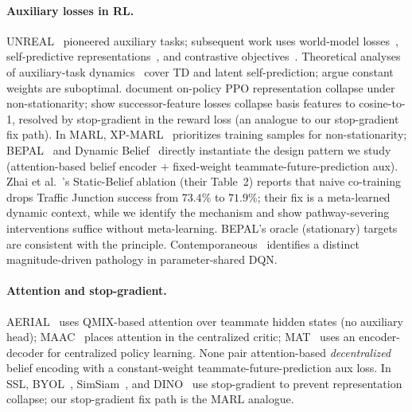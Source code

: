 \documentclass{article}
\theoremstyle{plain}
\theoremstyle{definition}
\theoremstyle{remark}
\begin{document}
\paragraph{Auxiliary losses in RL.}
UNREAL~\cite{jaderberg2016reinforcement} pioneered auxiliary tasks;
subsequent work uses world-model
losses~\cite{hafner2023mastering}, self-predictive
representations~\cite{schwarzer2021dataefficient,fang2024predictive},
and contrastive objectives~\cite{laskin2020curl}. Theoretical analyses
of auxiliary-task
dynamics~\cite{lyle2021effect,voelcker2024selfprediction} cover TD and
latent self-prediction; \cite{du2018adapting,lin2019adaptive} argue
constant weights are suboptimal.
\cite{moalla2024norepnotrust} document on-policy PPO representation
collapse under non-stationarity; \cite{chua2024successor} show
successor-feature losses collapse basis features to cosine-to-1,
resolved by stop-gradient in the reward loss (an analogue to our
stop-gradient fix path). In MARL,
XP-MARL~\cite{xu2024xpmarl} prioritizes training samples for
non-stationarity; BEPAL~\cite{huang2025bepal} and Dynamic
Belief~\cite{zhai2023dynamic} directly instantiate the design pattern
we study (attention-based belief encoder $+$ fixed-weight
teammate-future-prediction aux). Zhai et al.~\cite{zhai2023dynamic}'s
Static-Belief ablation (their Table~2) reports that naive co-training
drops Traffic Junction success from $73.4\%$ to $71.9\%$; their fix
is a meta-learned dynamic context, while we identify the mechanism
and show pathway-severing interventions suffice without
meta-learning. BEPAL's oracle (stationary) targets are consistent
with the principle. Contemporaneous~\cite{weng2026exploration}
identifies a distinct magnitude-driven pathology in parameter-shared
DQN.

\paragraph{Attention and stop-gradient.}
AERIAL~\cite{phan2023attention} uses QMIX-based attention over
teammate hidden states (no auxiliary head);
MAAC~\cite{iqbal2019actor} places attention in the centralized critic;
MAT~\cite{wen2022mat} uses an encoder-decoder for centralized policy
learning. None pair attention-based \emph{decentralized} belief
encoding with a constant-weight teammate-future-prediction aux loss.
In SSL, BYOL~\cite{grill2020bootstrap},
SimSiam~\cite{chen2021exploring}, and DINO~\cite{caron2021emerging} use
stop-gradient to prevent representation collapse; our stop-gradient
fix path is the MARL analogue.
\end{document}
